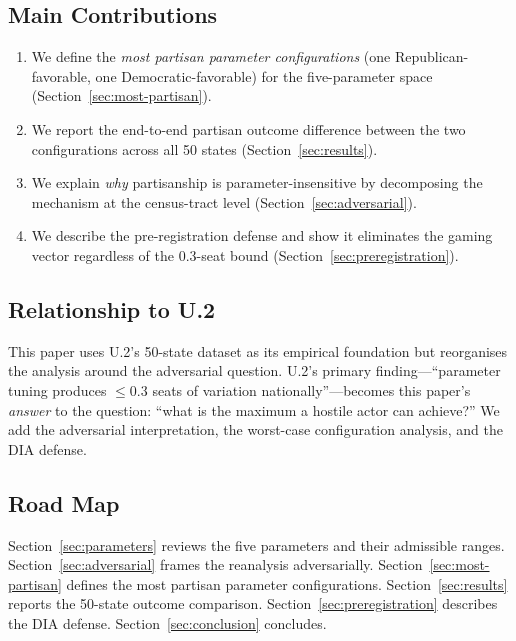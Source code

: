 \subsection{Main Contributions}

\begin{enumerate}
\item We define the \emph{most partisan parameter configurations}
  (one Republican-favorable, one Democratic-favorable) for the \bisect{}
  five-parameter space (Section~\ref{sec:most-partisan}).
\item We report the end-to-end partisan outcome difference between the two
  configurations across all 50 states (Section~\ref{sec:results}).
\item We explain \emph{why} partisanship is parameter-insensitive by
  decomposing the mechanism at the census-tract level
  (Section~\ref{sec:adversarial}).
\item We describe the \dia{} pre-registration defense and show it
  eliminates the gaming vector regardless of the 0.3-seat bound
  (Section~\ref{sec:preregistration}).
\end{enumerate}

\subsection{Relationship to U.2}

This paper uses U.2's 50-state dataset as its empirical foundation
but reorganises the analysis around the adversarial question.
U.2's primary finding---``parameter tuning produces $\leq 0.3$ seats of
variation nationally''---becomes this paper's \emph{answer} to the
question: ``what is the maximum a hostile actor can achieve?''
We add the adversarial interpretation, the worst-case configuration
analysis, and the DIA defense.

\subsection{Road Map}

Section~\ref{sec:parameters} reviews the five parameters and their
admissible ranges.
Section~\ref{sec:adversarial} frames the reanalysis adversarially.
Section~\ref{sec:most-partisan} defines the most partisan parameter
configurations.
Section~\ref{sec:results} reports the 50-state outcome comparison.
Section~\ref{sec:preregistration} describes the DIA defense.
Section~\ref{sec:conclusion} concludes.
